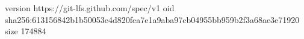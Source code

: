 version https://git-lfs.github.com/spec/v1
oid sha256:613156842b1b50053e4d820fea7e1a9aba97cb04955bb959b2f3a68ae3e71920
size 174884
